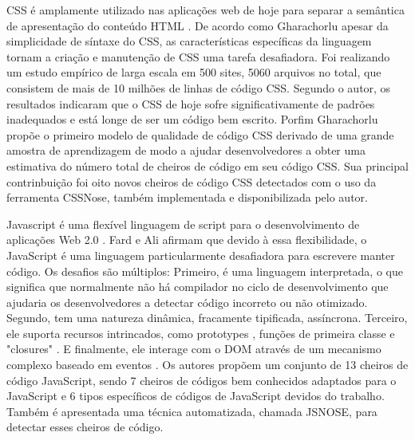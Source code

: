 CSS é amplamente utilizado nas aplicações web de hoje para separar a semântica de apresentação do conteúdo HTML \cite{CSSCodeSmell}. De acordo como Gharachorlu \cite{CSSCodeSmell} apesar da simplicidade de síntaxe do CSS, as características específicas da linguagem tornam a criação e manutenção de CSS uma tarefa desafiadora. Foi realizando um estudo empírico de larga escala em 500 sites, 5060 arquivos no total, que consistem de mais de 10 milhões de linhas de código CSS. Segundo o autor, os resultados indicaram que o CSS de hoje sofre significativamente de padrões inadequados e está longe de ser um código bem escrito. Porfim Gharachorlu \cite{CSSCodeSmell} propõe o primeiro modelo de qualidade de código CSS derivado de uma grande amostra de aprendizagem de modo a ajudar desenvolvedores a obter uma estimativa do número total de cheiros de código em seu código CSS. Sua principal contrinbuição foi oito novos cheiros de código CSS detectados com o uso da ferramenta CSSNose, também implementada e disponibilizada pelo autor.

Javascript é uma flexível linguagem de script para o desenvolvimento de aplicações Web 2.0 \cite{BB}. Fard e Ali \cite{BB} afirmam que devido à essa flexibilidade, o JavaScript é uma linguagem particularmente desafiadora para escrevere manter código. Os desafios são múltiplos: Primeiro, é uma linguagem interpretada, o que significa que normalmente não há compilador no ciclo de desenvolvimento que ajudaria os desenvolvedores a detectar código incorreto ou não otimizado. Segundo, tem uma natureza dinâmica, fracamente tipificada, assíncrona. Terceiro, ele suporta recursos intrincados, como prototypes \cite{CC}, funções de primeira classe e "closures" \cite{DD}. E finalmente, ele interage com o DOM através de um mecanismo complexo baseado em eventos \cite{EE}. Os autores propõem um conjunto de 13 cheiros de código JavaScript, sendo 7 cheiros de códigos bem conhecidos adaptados para o JavaScript e 6 tipos específicos de códigos de JavaScript devidos do trabalho. Também é apresentada uma técnica automatizada, chamada JSNOSE, para detectar esses cheiros de código.